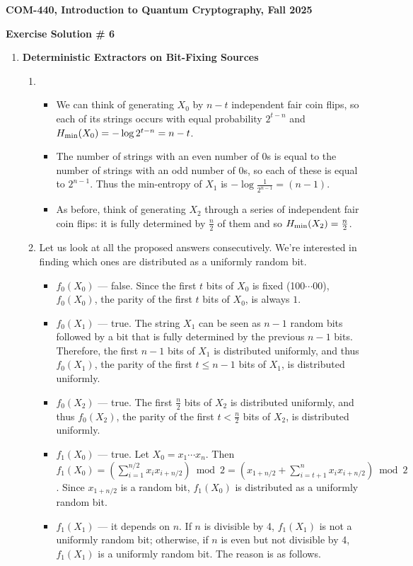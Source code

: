 \documentclass[12pt]{article}
\newcommand{\header}[1]{\begin{center} {\large\bf #1} \end{center}}
\begin{document}
\header{COM-440, Introduction to Quantum Cryptography, Fall 2025}
\header{\bf Exercise Solution \# 6}


\begin{enumerate}

\item {\bf Deterministic Extractors on Bit-Fixing Sources}

\begin{enumerate}
\item \begin{itemize}
 	\item We can think of generating $X_0$ by $n-t$ independent fair coin flips, so each of its strings occurs with equal probability $2^{t-n}$ and $H_{\rm min} (X_0) = -\log{2^{t-n}}=n-t$.
 	\item The number of strings with an even number of $0$s is equal to the number of strings with an odd number of $0$s, so each of these is equal to $2^{n-1}$. Thus the min-entropy of $X_1$ is $-\log \frac{1}{2^{n-1}}=(n-1)$.
 	\item As before, think of generating $X_2$ through a series of independent fair coin flips: it is fully determined by $\frac {n}{2}$ of them and so $H_{\rm min}(X_2)=\frac{n}{2}$.
 \end{itemize}

\item Let us look at all the proposed answers consecutively. We're interested in finding which ones are distributed as a uniformly random bit.
\begin{itemize}
\item $f_0(X_0)$ --- false. Since the first $t$ bits of $X_0$ is fixed (100$\cdots$00), $f_0(X_0)$, the parity of the first $t$ bits of $X_0$, is always $1$.
\item $f_0(X_1)$ --- true. The string $X_1$ can be seen as $n-1$ random bits followed by a bit that is fully determined by the previous $n-1$ bits. Therefore, the first $n - 1$ bits of $X_1$ is distributed uniformly, and thus $f_0(X_1)$, the parity of the first $t \leq n - 1$ bits of $X_1$, is distributed uniformly.
\item $f_0(X_2)$ --- true. The first $\frac{n}{2}$ bits of $X_2$ is distributed uniformly, and thus $f_0(X_2)$, the parity of the first $t < \frac{n}{2}$ bits of $X_2$, is distributed uniformly.
\item $f_1(X_0)$ --- true. Let $X_0 = x_1\cdots x_n$. Then $f_1(X_0) = \left(\sum_{i = 1}^{n/2}x_i x_{i + n/2}\right) \bmod 2 = \left(x_{1 + n/2} + \sum_{i = t + 1}^n x_i x_{i + n/2}\right) \bmod 2$. Since $x_{1 + n/2}$ is a random bit, $f_1(X_0)$ is distributed as a uniformly random bit.
\item $f_1(X_1)$ --- it depends on $n$. If $n$ is divisible by 4, $f_1(X_1)$ is not a uniformly random bit; otherwise, if $n$ is even but not divisible by 4, $f_1(X_1)$ is a uniformly random bit. The reason is as follows.


\end{itemize}
\end{enumerate}
\end{enumerate}
\end{document}
